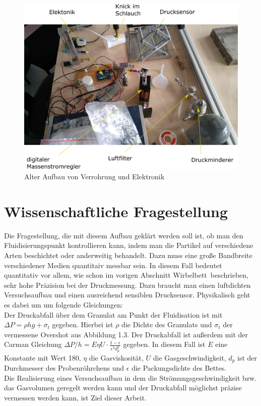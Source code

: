 \begin{figure}[h]
	\begin{center}
		\includegraphics[scale=0.6]{Kabel_Rohrleitungen_alt.png}
		\caption[Alter Aufbau 2]{Alter Aufbau von Verrohrung und Elektronik}
	\end{center}
\end{figure}


\section{Wissenschaftliche Fragestellung}

Die Fragestellung, die mit diesem Aufbau geklärt werden soll ist, ob man den Fluidisierungspunkt kontrollieren kann, indem man die Partikel auf verschiedene Arten beschichtet oder anderweitig behandelt. Dazu muss eine große Bandbreite verschiedener Medien quantitaiv messbar sein. In diesem Fall bedeutet quantitativ vor allem, wie schon im vorigen Abschnitt \glqq Wirbelbett\grqq \ beschrieben, sehr hohe Präzision bei der Druckmessung. Dazu braucht man einen luftdichten Versuchsaufbau und einen ausreichend sensiblen Drucksensor. Physikalisch geht es dabei um um folgende Gleichungen: \\
Der Druckabfall über dem Granulat am Punkt der Fluidisation ist mit $\Delta P = \rho h g + \sigma_t$ gegeben. Hierbei ist $\rho$ die Dichte des Granulats und $\sigma_t$ der vermessene Overshot aus Abbildung 1.3. Der Druckabfall ist außerdem mit der Carman Gleichung $\Delta P / h = E \eta U \cdot \frac{1 - \epsilon}{\epsilon^3 d_p^2}$ gegeben. In diesem Fall ist $E$ eine Konstante mit Wert 180, $\eta$ die Gasviskosität, $U$ die Gasgeschwindigkeit, $d_p$ ist der Durchmesser des Probenröhrchens und $\epsilon$ die Packungsdichte des Bettes. \\
Die Realisierung eines Versuchsaufbau in dem die Strömungsgeschwindigkeit bzw. das Gasvolumen geregelt werden kann und der Druckabfall möglichst präzise vermessen werden kann, ist Ziel dieser Arbeit.


